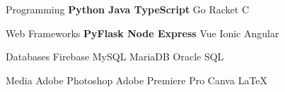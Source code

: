 

\begin{cvskills}

  \cvskill
  {Programming} %
  {\textbf{Python {\enskip\cdotp\enskip} Java {\enskip\cdotp\enskip} TypeScript} {\enskip\cdotp\enskip} Go {\enskip\cdotp\enskip} Racket {\enskip\cdotp\enskip} C } %

  \cvskill
  {Web Frameworks} %
  {\textbf{PyFlask {\enskip\cdotp\enskip} Node Express} {\enskip\cdotp\enskip} Vue {\enskip\cdotp\enskip} Ionic Angular}%

  \cvskill
  {Databases} %
  {Firebase {\enskip\cdotp\enskip} MySQL {\enskip\cdotp\enskip} MariaDB {\enskip\cdotp\enskip} Oracle SQL} %


  \cvskill
  {Media} %
  {Adobe Photoshop {\enskip\cdotp\enskip} Adobe Premiere Pro {\enskip\cdotp\enskip} Canva {\enskip\cdotp\enskip} \LaTeX} %



\end{cvskills}
